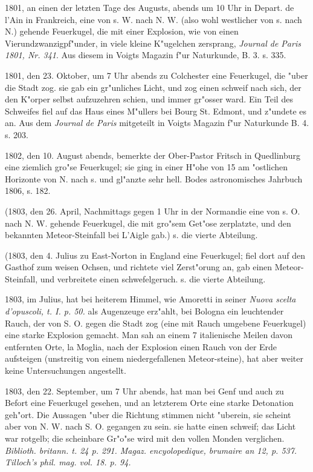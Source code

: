 \documentclass[a4paper, 11pt, oneside, polutonikogreek, german]{article}
\begin{document}
1801, an einen der letzten Tage des Augusts, abends um 10 Uhr in Depart. de l'Ain in Frankreich, eine von s. W. nach N. W. (also wohl westlicher von s. nach N.) gehende Feuerkugel, die mit einer Explosion, wie von einen Vierundzwanzigpf"under, in viele kleine K"ugelchen zersprang, \emph{Journal de Paris 1801, Nr. 341}. Aus diesem in Voigts Magazin f"ur Naturkunde, B. 3. s. 335.

1801, den 23. Oktober, um 7 Uhr abends zu Colchester eine Feuerkugel, die "uber die Stadt zog. sie gab ein gr"unliches Licht, und zog einen schweif nach sich, der den K"orper selbst aufzuzehren schien, und immer gr"osser ward. Ein Teil des Schweifes fiel auf das Haus eines M"ullers bei Bourg St. Edmont, und z"undete es an. Aus dem \emph{Journal de Paris} mitgeteilt in Voigts Magazin f"ur Naturkunde B. 4. s. 203.

1802, den 10. August abends, bemerkte der Ober-Pastor Fritsch in Quedlinburg eine ziemlich gro"se Feuerkugel; sie ging in einer H"ohe von 15 am "ostlichen Horizonte von N. nach s. und gl"anzte sehr hell. Bodes astronomisches Jahrbuch 1806, s. 182.

(1803, den 26. April, Nachmittags gegen 1 Uhr in der Normandie eine von s. O. nach N. W. gehende Feuerkugel, die mit gro"sem Get"ose zerplatzte, und den bekannten Meteor-Steinfall bei L'Aigle gab.) s. die vierte Abteilung.

(1803, den 4. Julius zu East-Norton in England eine Feuerkugel; fiel dort auf den Gasthof zum weisen Ochsen, und richtete viel Zerst"orung an, gab einen Meteor-Steinfall, und verbreitete einen schwefelgeruch. s. die vierte Abteilung.

1803, im Julius, hat bei heiterem Himmel, wie Amoretti in seiner \emph{Nuova scelta d'opuscoli, t. I. p. 50.} als Augenzeuge erz"ahlt, bei Bologna ein leuchtender Rauch, der von S. O. gegen die Stadt zog (eine mit Rauch umgebene Feuerkugel) eine starke Explosion gemacht. Man sah an einem 7 italienische Meilen davon entfernten Orte, la Moglia, nach der Explosion einen Rauch von der Erde aufsteigen (unstreitig von einem niedergefallenen Meteor-steine), hat aber weiter keine Untersuchungen angestellt.

1803, den 22. September, um 7 Uhr abends, hat man bei Genf und auch zu Befort eine Feuerkugel gesehen, und an letzterem Orte eine starke Detonation geh"ort. Die Aussagen "uber die Richtung stimmen nicht "uberein, sie scheint aber von N. W. nach S. O. gegangen zu sein. sie hatte einen schweif; das Licht war rotgelb; die scheinbare Gr"o"se wird mit den vollen Monden verglichen. \emph{Biblioth. britann. t. 24 p. 291. Magaz. encyolopedique, brumaire an 12, p. 537. Tilloch's phil. mag. vol. 18. p. 94.}
\end{document}
